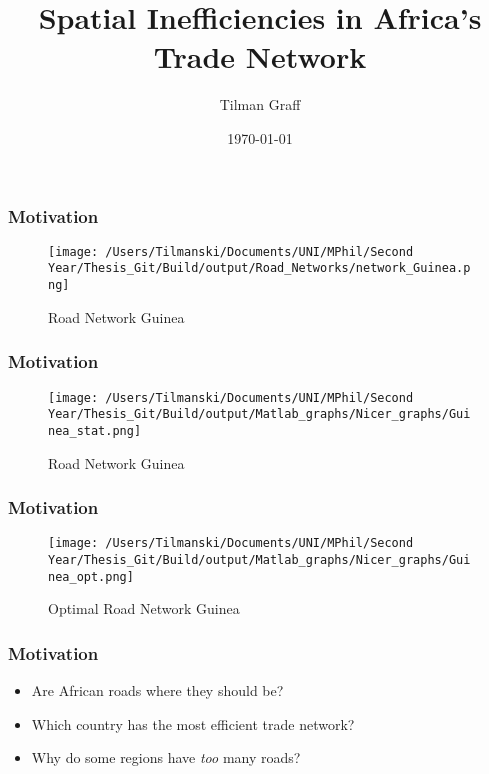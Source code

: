 \documentclass[]{beamer}   	%
\title{Spatial Inefficiencies in Africa's Trade Network}
\author{Tilman Graff}
\institute{University of Oxford}
\date{\today}
\begin{document}
\begin{frame}
  \titlepage
\end{frame}

\begin{frame}
  \frametitle{Motivation}
  \begin{figure}
    \texttt{[image: /Users/Tilmanski/Documents/UNI/MPhil/Second Year/Thesis\_Git/Build/output/Road\_Networks/network\_Guinea.png]}
    \caption{Road Network Guinea}

  \end{figure}
\end{frame}

\begin{frame}
  \frametitle{Motivation}
\begin{figure}
    \texttt{[image: /Users/Tilmanski/Documents/UNI/MPhil/Second Year/Thesis\_Git/Build/output/Matlab\_graphs/Nicer\_graphs/Guinea\_stat.png]}
    \caption{Road Network Guinea}

  \end{figure}
\end{frame}

\begin{frame}
  \frametitle{Motivation}
\begin{figure}
    \texttt{[image: /Users/Tilmanski/Documents/UNI/MPhil/Second Year/Thesis\_Git/Build/output/Matlab\_graphs/Nicer\_graphs/Guinea\_opt.png]}
    \caption{Optimal Road Network Guinea}

  \end{figure}
\end{frame}

\begin{frame}
  \frametitle{Motivation}
  \begin{itemize}
    \item Are African roads where they should be?
    \item Which country has the most efficient trade network?
    \item Why do some regions have \emph{too} many roads?
  \end{itemize}
\end{frame}

\end{document}
